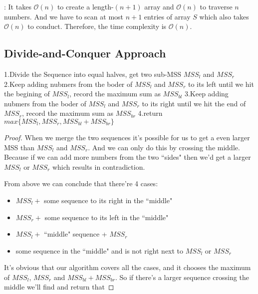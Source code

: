 \documentclass[11pt]{article}
\renewcommand{\O}{\mathcal{O}}
\begin{document}
{{: It takes $\O(n)$ to create a length-$(n+1)$ array and $\O(n)$ to traverse $n$ numbers. And we have to scan at most $n+1$ entries of array $S$ which also takes $\O(n)$ to conduct. Therefore, the time complexity is $\O(n)$.

\subsection{Divide-and-Conquer Approach}


\begin{algorithm}
\begin{algorithmic}
  \State 1.Divide the Sequence into equal halves, get two sub-MSS $MSS_l$ and $MSS_r$
  \State 2.Keep adding nubmers from the boder of $MSS_l$ and $MSS_r$ to its left until we hit the begining of $MSS_l$, record the maximum sum as $MSS_{bl}$
  \State 3.Keep adding nubmers from the boder of $MSS_l$ and $MSS_r$ to its right until we hit the end of $MSS_r$, record the maximum sum as $MSS_{br}$
  \State 4.return $max\{MSS_l, MSS_r, MSS_{bl}+MSS_{br}\}$
\end{algorithmic}
\end{algorithm}

\begin{proof}
When we merge the two sequences it's possible for us to get a even larger MSS than $MSS_l$ and $MSS_r$. And we can only do this by crossing the middle. Because if we can add more numbers from the two ``sides" then we'd get a larger $MSS_l$ or $MSS_r$ which results in contradiction.

From above we can conclude that there're 4 cases:
\begin{itemize}
\item $MSS_l +$ some sequence to its right in the ``middle"
\item $MSS_r +$ some sequence to its left in the ``middle"
\item $MSS_l +$ ``middle" sequence + $MSS_r$
\item some sequence in the ``middle" and is not right next to $MSS_l$ or $MSS_r$
\end{itemize}

It's obvious that our algorithm covers all the cases, and it chooses the maximum of $MSS_l$, $MSS_r$ and $MSS_{bl}+MSS_{br}$. So if there's a larger sequence crossing the middle we'll find and return that

\end{proof}

}}
\end{document}
